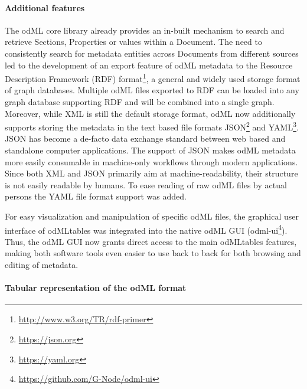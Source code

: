 {\paragraph{Additional features}
The odML core library already provides an in-built mechanism to search and retrieve Sections, Properties or values within a Document. The need to consistently search for metadata entities across Documents from different sources led to the development of an export feature of odML metadata to the Resource Description Framework (RDF) format\footnote{\url{http://www.w3.org/TR/rdf-primer}}, a general and widely used storage format of graph databases. Multiple odML files exported to RDF can be loaded into any graph database supporting RDF and will be combined into a single graph. Moreover, while XML is still the default storage format, odML now additionally supports storing the metadata in the text based file formats JSON\footnote{\url{https://json.org}} and YAML\footnote{\url{https://yaml.org}}. JSON has become a de-facto data exchange standard between web based and standalone computer applications. The support of JSON makes odML metadata more easily consumable in machine-only workflows through modern applications. Since both XML and JSON primarily aim at machine-readability, their structure is not easily readable by humans. To ease reading of raw odML files by actual persons the YAML file format support was added.

For easy visualization and manipulation of specific odML files, the graphical user interface of odMLtables was integrated into the native odML GUI (odml-ui\footnote{\url{https://github.com/G-Node/odml-ui}}). Thus, the odML GUI now grants direct access to the main odMLtables features, making both software tools even easier to use back to back for both browsing and editing of metadata.

\paragraph{Tabular representation of the odML format} 
\label{sec:tabular_format}

}
